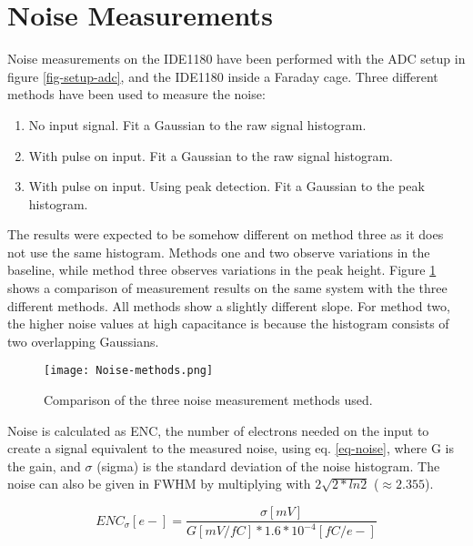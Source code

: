 \documentclass[../main/thesis.tex]{subfiles}
\begin{document}
\newpage
\section{Noise Measurements}
\label{ide-noise}

Noise measurements on the IDE1180 have been performed with the ADC setup in figure \ref{fig-setup-adc}, and the IDE1180 inside a Faraday cage. Three different methods have been used to measure the noise:
\begin{enumerate}  
	\item No input signal. Fit a Gaussian to the raw signal histogram. 
	\item With pulse on input. Fit a Gaussian to the raw signal histogram.  
	\item With pulse on input. Using peak detection. Fit a Gaussian to the peak histogram.   
\end{enumerate}

The results were expected to be somehow different on method three as it does not use the same histogram. Methods one and two observe variations in the baseline, while method three observes variations in the peak height. Figure \ref{fig-noise-methods} shows a comparison of measurement results on the same system with the three different methods. All methods show a slightly different slope. For method two, the higher noise values at high capacitance is because the histogram consists of two overlapping Gaussians.  %

\begin{figure}[h!]   %
	\centering
	\texttt{[image: Noise-methods.png]}
	\caption{Comparison of the three noise measurement methods used.}
	\label{fig-noise-methods}
\end{figure} 

Noise is calculated as \acrfull{ENC}, the number of electrons needed on the input to create a signal equivalent to the measured noise, using eq. \ref{eq-noise}, where G is the gain, and $\sigma$ (sigma) is the standard deviation of the noise histogram. The noise can also be given in \gls{FWHM} by multiplying with $2\sqrt{2*ln2}$ ($\approx 2.355$). 

\begin{equation}%
ENC_\sigma [e-] = \frac{\sigma [mV]}{G [mV/fC]*1.6*10^{-4} [fC/e-]}
\label{eq-noise}
\end{equation}
\end{document}
